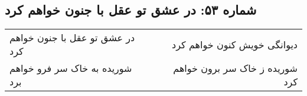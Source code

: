 \begin{center}
\section*{شماره ۵۳: در عشق تو عقل با جنون خواهم کرد}
\label{sec:053}
\begin{longtable}{l p{0.5cm} r}
در عشق تو عقل با جنون خواهم کرد
&&
دیوانگی خویش کنون خواهم کرد
\\
شوریده به خاک سر فرو خواهم برد
&&
شوریده ز خاک سر برون خواهم کرد
\\
\end{longtable}
\end{center}

